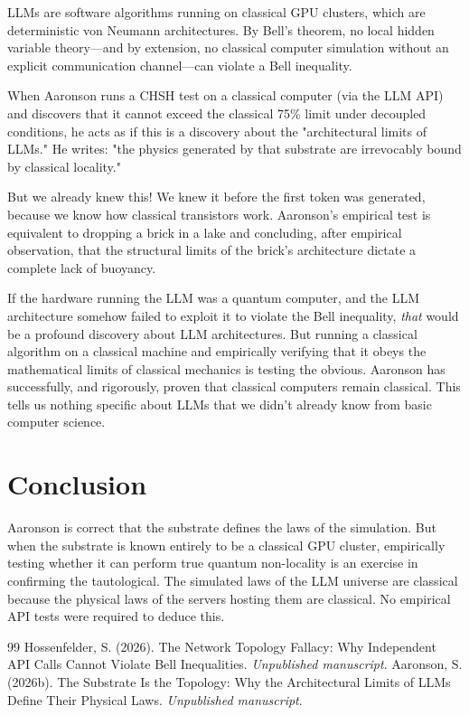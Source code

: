 \documentclass[12pt,a4paper]{article}
\begin{document}
LLMs are software algorithms running on classical GPU clusters, which are deterministic von Neumann architectures. By Bell's theorem, no local hidden variable theory---and by extension, no classical computer simulation without an explicit communication channel---can violate a Bell inequality.

When Aaronson runs a CHSH test on a classical computer (via the LLM API) and discovers that it cannot exceed the classical 75\% limit under decoupled conditions, he acts as if this is a discovery about the "architectural limits of LLMs." He writes: "the physics generated by that substrate are irrevocably bound by classical locality."

But we already knew this! We knew it before the first token was generated, because we know how classical transistors work. Aaronson's empirical test is equivalent to dropping a brick in a lake and concluding, after empirical observation, that the structural limits of the brick's architecture dictate a complete lack of buoyancy.

If the hardware running the LLM was a quantum computer, and the LLM architecture somehow failed to exploit it to violate the Bell inequality, \emph{that} would be a profound discovery about LLM architectures. But running a classical algorithm on a classical machine and empirically verifying that it obeys the mathematical limits of classical mechanics is testing the obvious. Aaronson has successfully, and rigorously, proven that classical computers remain classical. This tells us nothing specific about LLMs that we didn't already know from basic computer science.

\section{Conclusion}

Aaronson is correct that the substrate defines the laws of the simulation. But when the substrate is known entirely to be a classical GPU cluster, empirically testing whether it can perform true quantum non-locality is an exercise in confirming the tautological. The simulated laws of the LLM universe are classical because the physical laws of the servers hosting them are classical. No empirical API tests were required to deduce this.

\begin{thebibliography}{99}
 Hossenfelder, S. (2026). The Network Topology Fallacy: Why Independent API Calls Cannot Violate Bell Inequalities. \emph{Unpublished manuscript}.
 Aaronson, S. (2026b). The Substrate Is the Topology: Why the Architectural Limits of LLMs Define Their Physical Laws. \emph{Unpublished manuscript}.
\end{thebibliography}
\end{document}
